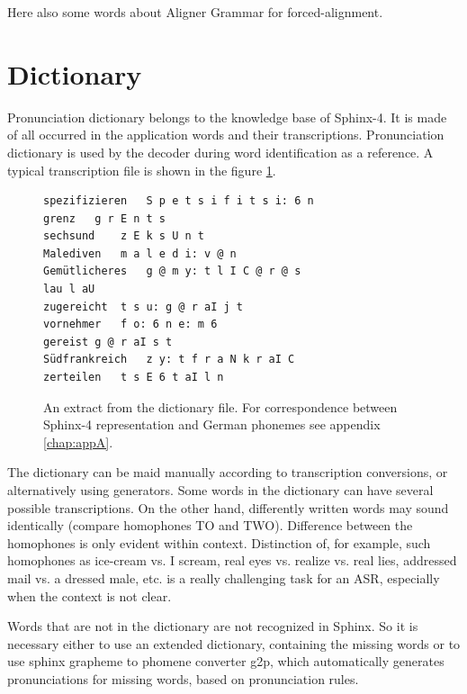 Here also some words about Aligner Grammar for forced-alignment. 

\section {Dictionary} 

Pronunciation dictionary belongs to the knowledge base of Sphinx-4. It is made
of all occurred in the application words and their transcriptions. Pronunciation dictionary is used by the decoder during word identification as a reference. 
A typical transcription file is shown in the figure \ref {fig:dic}.
\newline
\begin{figure}[htbp]
{}
%  
%  
\begin{lstlisting}[frame=single]
spezifizieren	S p e t s i f i t s i: 6 n  
grenz	g r E n t s 
sechsund	z E k s U n t
Malediven	m a l e d i: v @ n
Gemütlicheres	g @ m y: t l I C @ r @ s
lau	l aU
zugereicht	t s u: g @ r aI j t
vornehmer	f o: 6 n e: m 6
gereist	g @ r aI s t
Südfrankreich	z y: t f r a N k r aI C
zerteilen	t s E 6 t aI l n
\end{lstlisting}
 \caption{An extract from the dictionary file. For correspondence between
 Sphinx-4 representation and German phonemes see appendix \ref{chap:appA}. }
  \label{fig:dic}
\end {figure}
\newline
The dictionary can be maid manually according to transcription conversions, or
alternatively using generators. Some words in the dictionary can have several possible transcriptions. On the other hand, differently written words 
may sound identically (compare homophones TO and TWO). Difference between the homophones is only evident within context. Distinction of, for 
example, such homophones as ice-cream vs. I scream, real eyes vs. realize vs. real lies, addressed mail vs. a dressed male, etc. is a really 
challenging task for an ASR, especially when the context is not clear.

Words that are not in the dictionary are not recognized in Sphinx. So it is
necessary either to use an extended dictionary, containing the missing words or to use 
sphinx  grapheme to phomene converter g2p, which automatically generates
pronunciations for missing words, based on pronunciation rules.  

